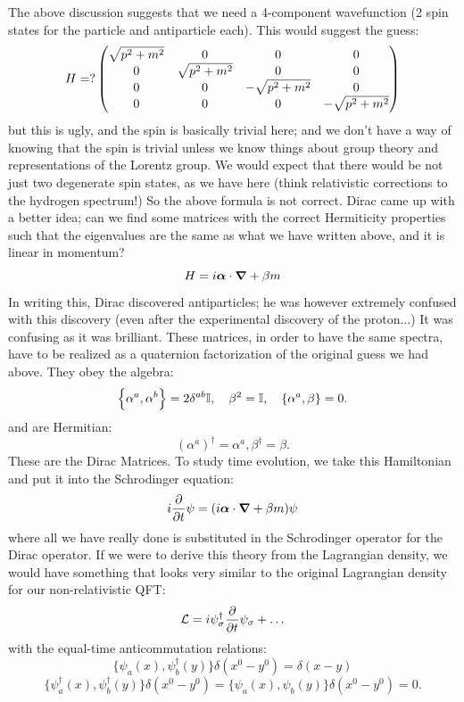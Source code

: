 The above discussion suggests that we need a 4-component wavefunction (2 spin states for the particle and antiparticle each). This would suggest the guess:
\begin{equation}
    H =? \begin{pmatrix}\sqrt{p^2 + m^2} & 0 & 0 & 0 \\ 0 & \sqrt{p^2 + m^2} & 0 & 0 \\ 0 & 0 & -\sqrt{p^2 + m^2} & 0 \\ 0 & 0 & 0 & -\sqrt{p^2 + m^2}\end{pmatrix}
\end{equation}
but this is ugly, and the spin is basically trivial here; and we don't have a way of knowing that the spin is trivial unless we know things about group theory and representations of the Lorentz group. We would expect that there would be not just two degenerate spin states, as we have here (think relativistic corrections to the hydrogen spectrum!) So the above formula is not correct. Dirac came up with a better idea; can we find some matrices with the correct Hermiticity properties such that the eigenvalues are the same as what we have written above, and it is linear in momentum?
\begin{equation}
    H = i\gv{\alpha}\cdot \nabla + \beta m
\end{equation}
In writing this, Dirac discovered antiparticles; he was however extremely confused with this discovery (even after the experimental discovery of the proton...) It was confusing as it was brilliant. These matrices, in order to have the same spectra, have to be realized as a quaternion factorization of the original guess we had above. They obey the algebra:
\begin{equation}
    \set{\alpha^a, \alpha^b} = 2\delta^{ab}\mathbb{I}, \quad \beta^2 = \mathbb{I}, \quad \set{\alpha^a, \beta} = 0.
\end{equation}
and are Hermitian:
\begin{equation}
    (\alpha^a)^\dag = \alpha^a, \beta^\dag = \beta.
\end{equation}
These are the Dirac Matrices. To study time evolution, we take this Hamiltonian and put it into the Schrodinger equation:
\begin{equation}
    i\dpd{}{t}\psi = (i\gv{\alpha} \cdot \nabla + \beta m)\psi
\end{equation}
where all we have really done is substituted in the Schrodinger operator for the Dirac operator. If we were to derive this theory from the Lagrangian density, we would have something that looks very similar to the original Lagrangian density for our non-relativistic QFT:
\begin{equation}
    \mathcal{L} = i\psi^{\dagger}_\sigma \frac{\partial }{\partial t}\psi_\sigma + \ldots
\end{equation}
with the equal-time anticommutation relations:
\begin{equation}
    \{\psi_a(x), \psi^{\dag}_b(y)\}\delta(x^0 - y^0) = \delta(x - y)
\end{equation}
\begin{equation}
    \{\psi^\dag_a(x), \psi^{\dag}_b(y)\}\delta(x^0 - y^0) = \{\psi_a(x), \psi_b(y)\}\delta(x^0 - y^0) = 0.
\end{equation}

